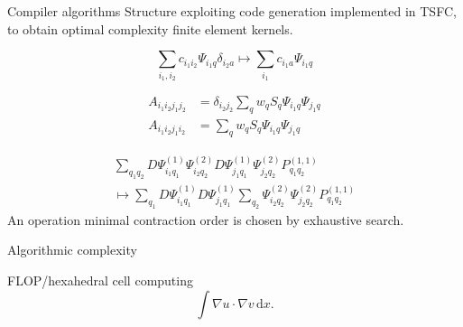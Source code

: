 \documentclass[a0paper,portrait]{baposter}
\begin{document}
\begin{poster}
  \begin{posterbox}[name=rules, column=0, below=structure, span=3]{Compiler algorithms}
    Structure exploiting code generation implemented in TSFC, to obtain optimal complexity finite element kernels.
    \begin{tcbraster}[raster columns=6]
      \begin{tcolorbox}[raster multicolumn=3, title={Delta cancellation},left=0mm,right=0mm,top=0mm,bottom=0mm,boxsep=0.5mm,valign upper=center]
        \begin{equation*}
          \sum_{i_1, i_2} c_{i_1 i_2} \Psi_{i_1 q}
          \delta_{i_2 a} \mapsto \sum_{i_1} c_{i_1 a}\Psi_{i_1 q}
        \end{equation*}
      \end{tcolorbox}
      \begin{tcolorbox}[raster multicolumn=3, title={\dots across assignments},left=0mm,right=0mm,top=0mm,bottom=0mm,boxsep=0.5mm,valign upper=center]
        \begin{align*}
          A_{i_1 i_2 j_1 j_2} &= \delta_{i_2 j_2} \sum_q w_q S_q \Psi_{i_1 q}\Psi_{j_1 q} \\
          A_{i_1 i_2 j_1 i_2} &= \sum_q w_q S_q \Psi_{i_1 q}\Psi_{j_1 q}
        \end{align*}
      \end{tcolorbox}
      \begin{tcolorbox}[raster multicolumn=6, title={Sum factorisation},left=0mm,right=0mm,top=0mm,bottom=0mm,boxsep=0.5mm,valign upper=center, halign=center]
        \begin{align*}
          \sum_{q_1 q_2} D\Psi^{(1)}_{i_1 q_1}\Psi^{(2)}_{i_2 q_2} D\Psi^{(1)}_{j_1 q_1}\Psi^{(2)}_{j_2 q_2} P^{(1,1)}_{q_1 q_2} \\
          \mapsto \sum_{q_1} D\Psi^{(1)}_{i_1 q_1} D\Psi^{(1)}_{j_1 q_1} \sum_{q_2}  \Psi^{(2)}_{i_2 q_2}\Psi^{(2)}_{j_2 q_2} P^{(1,1)}_{q_1 q_2}
        \end{align*}
        An operation minimal contraction order is chosen by exhaustive search.
      \end{tcolorbox}
    \end{tcbraster}
  \end{posterbox}

  \begin{posterbox}[name=flop-scaling, column=3, below=introduction, span=3]{Algorithmic complexity}
    \begin{center}
      FLOP/hexahedral cell computing
      \begin{equation*}
      \int\!\nabla u \cdot \nabla v\,\text{d}x.
    \end{equation*}


\end{center}
\end{posterbox}
\end{poster}
\end{document}
